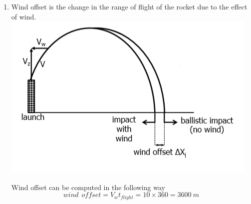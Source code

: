 \begin{enumerate}[label=(\alph*)]
\item
Wind offset is the change in the range of flight of the rocket due to the effect of wind.\\
\includegraphics[scale=1]{4c}

Wind offset can be computed in the following way
$$wind\:\: offset = V_wt_{flight} = 10\times360 = 3600\: m$$
\end{enumerate}